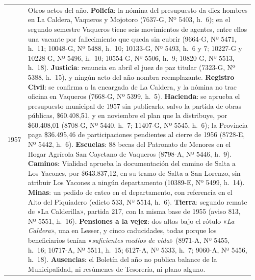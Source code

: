 \begin{longtable}{@{}p{2.7cm}p{10.3cm}@{}}
1957 & Otros actos del año. \textbf{Policía}: la nómina del presupuesto da diez hombres en La Caldera, Vaqueros y Mojotoro (7637-G, Nº 5403, h.\ 6); en el segundo semestre Vaqueros tiene seis movimientos de agentes, entre ellos una vacante por fallecimiento que queda sin cubrir (9664-G, Nº 5471, h.\ 11; 10048-G, Nº 5488, h.\ 10; 10133-G, Nº 5493, h.\ 6 y 7; 10227-G y 10228-G, Nº 5496, h.\ 10; 10554-G, Nº 5506, h.\ 9; 10820-G, Nº 5513, h.\ 18). \textbf{Justicia}: renuncia en abril el juez de paz titular (7323-G, Nº 5388, h.\ 15), y ningún acto del año nombra reemplazante. \textbf{Registro Civil}: se confirma a la encargada de La Caldera, y la nómina no trae oficina en Vaqueros (7668-G, Nº 5399, h.\ 5). \textbf{Hacienda}: se aprueba el presupuesto municipal de 1957 sin publicarlo, salvo la partida de obras públicas, \$60.408,51, y en noviembre el plan que la distribuye, por \$60.408,01 (8708-G, Nº 5440, h.\ 7; 11407-G, Nº 5545, h.\ 6); la Provincia paga \$36.495,46 de participaciones pendientes al cierre de 1956 (8728-E, Nº 5442, h.\ 6). \textbf{Escuelas}: 88 becas del Patronato de Menores en el Hogar Agrícola San Cayetano de Vaqueros (8798-A, Nº 5446, h.\ 9). \textbf{Caminos}: Vialidad aprueba la documentación del camino de Salta a Los Yacones, por \$643.837,12, en su tramo de Salta a San Lorenzo, sin atribuir Los Yacones a ningún departamento (10389-E, Nº 5499, h.\ 14). \textbf{Minas}: un pedido de cateo en el departamento, con referencia en el Alto del Piquiadero (edicto 533, Nº 5514, h.\ 6). \textbf{Tierra}: segundo remate de «La Calderilla», partida 217, con la misma base de 1955 (aviso 813, Nº 5551, h.\ 16). \textbf{Pensiones a la vejez}: dos altas bajo el rótulo «\textit{La Caldera}», una en Lesser, y cinco caducidades, todas porque los beneficiarios tenían «\textit{suficientes medios de vida}» (8971-A, Nº 5455, h.\ 16; 10717-A, Nº 5511, h.\ 15; 6127-A, Nº 5333, h.\ 7; 9060-A, Nº 5456, h.\ 18). \textbf{Ausencias}: el Boletín del año no publica balance de la Municipalidad, ni resúmenes de Tesorería, ni plano alguno. \\

\end{longtable}
